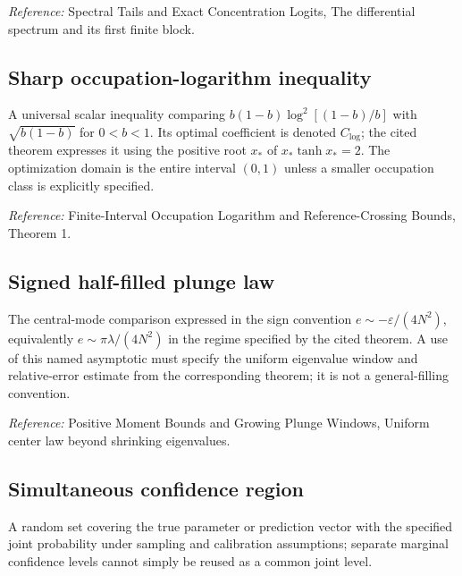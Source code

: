 \documentclass[
  10pt,
  a4paper,
]{article}
\begin{document}
\nopagebreak[4]

\emph{Reference:} Spectral Tails and Exact Concentration Logits, The differential spectrum and its first finite block.

\subsection{Sharp occupation-logarithm inequality}\label{sharp-occupation-logarithm-inequality}

A universal scalar inequality comparing \(b(1-b)\log^2[(1-b)/b]\) with \(\sqrt{b(1-b)}\) for \(0<b<1\). Its optimal coefficient is denoted \(C_{\log}\); the cited theorem expresses it using the positive root \(x_*\) of \(x_*\tanh x_*=2\). The optimization domain is the entire interval \((0,1)\) unless a smaller occupation class is explicitly specified.

\nopagebreak[4]

\emph{Reference:} Finite-Interval Occupation Logarithm and Reference-Crossing Bounds, Theorem 1.

\subsection{Signed half-filled plunge law}\label{signed-half-filled-plunge-law}

The central-mode comparison expressed in the sign convention \(e\sim-\varepsilon/(4N^2)\), equivalently \(e\sim\pi\lambda/(4N^2)\) in the regime specified by the cited theorem. A use of this named asymptotic must specify the uniform eigenvalue window and relative-error estimate from the corresponding theorem; it is not a general-filling convention.

\nopagebreak[4]

\emph{Reference:} Positive Moment Bounds and Growing Plunge Windows, Uniform center law beyond shrinking eigenvalues.

\subsection{Simultaneous confidence region}\label{simultaneous-confidence-region}

A random set covering the true parameter or prediction vector with the specified joint probability under sampling and calibration assumptions; separate marginal confidence levels cannot simply be reused as a common joint level.

\nopagebreak[4]
\end{document}
